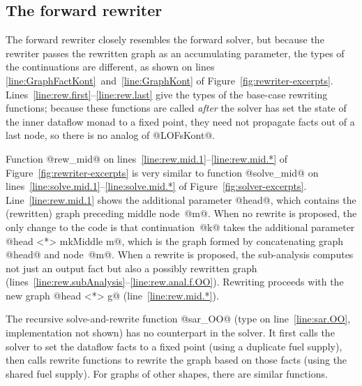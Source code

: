 \documentclass[blockstyle,preprint,natbib,nocopyrightspace]{sigplanconf}
\newcommand\lineref[1]{line~\ref{line:#1}}
\newcommand\linepairref[2]{lines \ref{line:#1}~and~\ref{line:#2}}
\newcommand\linerangeref[2]{\mbox{lines~\ref{line:#1}--\ref{line:#2}}}
\newcommand\Lineref[1]{Line~\ref{line:#1}}
\newcommand\Linerangeref[2]{\mbox{Lines~\ref{line:#1}--\ref{line:#2}}}
\newcommand\seclabel[1]{\label{sec:#1}}
\newcommand\figref[1]{Figure~\ref{fig:#1}}
\begin{document}



\subsection{The forward rewriter}

\seclabel{forward-rewriter}

The forward rewriter closely resembles the
forward solver, but because the rewriter passes the rewritten graph as
an accumulating parameter, the types of the continuations are
different, as shown on \linepairref{GraphFactKont}{GraphKont} of
\figref{rewriter-excerpts}. 
\Linerangeref{rew.first}{rew.last} give the types of the base-case
rewriting functions; because these functions are called \emph{after}
the solver has set the state of the inner dataflow monad to a fixed
point, they need not propagate facts out of a last node, so there is
no analog of @LOFsKont@.

Function @rew_mid@ on \linerangeref{rew.mid.1}{rew.mid.*} of
\figref{rewriter-excerpts} is very similar to function @solve_mid@ on 
\linerangeref{solve.mid.1}{solve.mid.*} of \figref{solver-excerpts}.
\Lineref{rew.mid.1} shows the additional parameter @head@, which
contains the (rewritten) graph preceding middle node~@m@.
When no rewrite is proposed, the only change to the code is that
continuation~@k@ takes the additional parameter
@head <*> mkMiddle m@,
which is the graph formed by concatenating graph @head@ and node~@m@. 
When a rewrite is proposed, the sub-analysis computes not just an
output fact but also a possibly rewritten graph
(\linerangeref{rew.subAnalysis}{rew.anal.f.OO}).
Rewriting proceeds with the new graph @head <*> g@
(\lineref{rew.mid.*}).

The recursive solve-and-rewrite function @sar_OO@ (type on
\lineref{sar.OO}, implementation not shown) 
has no counterpart in the solver.
It first calls the solver to set the dataflow facts to a fixed
point (using a duplicate fuel supply), then calls rewrite functions to
rewrite the graph based on 
those facts (using the shared fuel supply). 
For graphs of other shapes,
there are similar functions.
\end{document}
